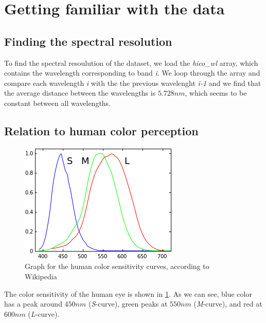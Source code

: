 \section{Getting familiar with the data}

\subsection{Finding the spectral resolution}

To find the spectral resoulution of the dataset, we load the \textit{hico\_wl} array, which contains the
wavelength corresponding to band \textit{i}. We loop through the array and compare each wavelength
\textit{i} with the the previous wavelenght \textit{i-1} and we find that the average distance between
the wavelengths is $5.728 nm$, which seems to be constant between all wavelengths. 

\subsection{Relation to human color perception}

\begin{figure}
    \centering
    \includegraphics[width=\textwidth]{../fig/human_spectrum.png}
    \caption{Graph for the human color sensitivity curves, according to Wikipedia \cite{website:wiki_spectral}}
    \label{fig:human_spectra}
\end{figure}

The color sensitivity of the human eye is shown in \cref{fig:human_spectra}. As we can 
see, blue color has a peak around $450 nm$ (\textit{S}-curve), green peaks at $550 nm$ 
(\textit{M}-curve), and red at $600 nm$ (\textit{L}-curve). 

